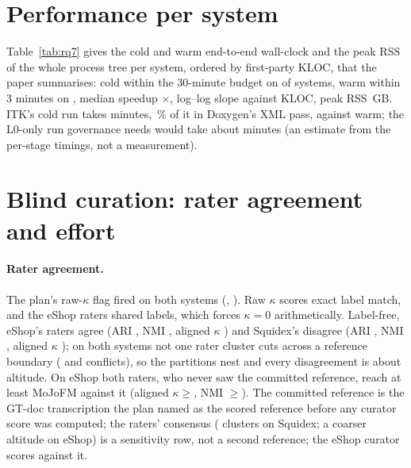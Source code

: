 \documentclass[10pt,conference]{IEEEtran}
\begin{document}
\section{Performance per system}
\label{sec:tr-perf}


Table~\ref{tab:rq7} gives the cold and warm end-to-end wall-clock and the peak RSS of the whole
process tree per system, ordered by first-party KLOC, that the paper summarises: cold within the
30-minute budget on \rqSevenColdBudget{} of \rqSevenSystems{} systems, warm within 3 minutes on
\rqSevenWarmBudget{}, median speedup \rqSevenMedianSpeedup$\times$, log--log slope
\rqSevenScalingSlope{} against KLOC, peak RSS \rqSevenMaxPeakRssGb{}\,GB. ITK's cold run takes
\rqSevenItkColdMin{} minutes, \rqSevenItkDoxygenSharePct{}\,\% of it in Doxygen's XML pass,
against \rqSevenItkWarmMin{} warm; the L0-only run governance needs would take about
\rqSevenItkLZeroImpliedMin{} minutes (an estimate from the per-stage timings, not a measurement).

\section{Blind curation: rater agreement and effort}
\label{sec:tr-curation}



\paragraph{Rater agreement.} The plan's raw-$\kappa$ flag fired on both systems
(\rqNineEshopKappa{}, \rqNineSquidexKappa{}). Raw $\kappa$ scores exact label match, and the eShop
raters shared \rqNineEshopLabelsShared{} labels, which forces $\kappa=0$ arithmetically.
Label-free, eShop's raters agree (ARI \rqNineEshopAri{}, NMI \rqNineEshopNmi{}, aligned $\kappa$
\rqNineEshopKappaAligned{}) and Squidex's disagree (ARI \rqNineSquidexAri{}, NMI
\rqNineSquidexNmi{}, aligned $\kappa$ \rqNineSquidexKappaAligned{}); on both systems not one rater
cluster cuts across a reference boundary (\rqNineEshopRaterConflicts{} and
\rqNineSquidexRaterConflicts{} conflicts), so the partitions nest and every disagreement is about
altitude. On eShop both raters, who never saw the committed reference, reach at least
\rqNineEshopRaterRefMoJoMin{} MoJoFM against it (aligned
$\kappa\ge$\rqNineEshopRaterRefKappaAlignedMin{}, NMI $\ge$\rqNineEshopRaterRefNmiMin{}). The
committed reference is the GT-doc transcription the plan named as the scored reference before any
curator score was computed; the raters' consensus (\rqNineSquidexConsensusClusters{} clusters on
Squidex; a coarser altitude on eShop) is a sensitivity row, not a second reference; the eShop
curator scores \rqNineEshopCuratorVsConsensusMoJo{} against it.
\end{document}
